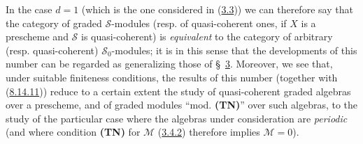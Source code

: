 \begin{remark}[8.14.12]
In the case $d=1$ (which is the one considered in
(\hyperref[subsection:II.3.3]{3.3})) we can therefore say that the category
of graded $\mathcal{S}$-modules (resp. of quasi-coherent ones, if $X$ is a
prescheme and $\mathcal{S}$ is quasi-coherent) is \emph{equivalent} to the
category of arbitrary (resp. quasi-coherent) $\mathcal{S}_0$-modules; it is in
this sense that the developments of this number can be regarded as
generalizing those of \S~\hyperref[section:II.3]{3}. Moreover, we see that,
under suitable finiteness conditions, the results of this number
(together with (\hyperref[II.8.14.11]{8.14.11})) reduce to a certain
extent the study of quasi-coherent graded algebras over a prescheme, and of
graded modules ``mod. \textbf{(TN)}'' over such algebras, to the study of the
particular case where the algebras under consideration are \emph{periodic}
(and where condition \textbf{(TN)} for $\mathcal{M}$
(\hyperref[II.3.4.2]{3.4.2}) therefore implies $\mathcal{M}=0$).
\end{remark}

